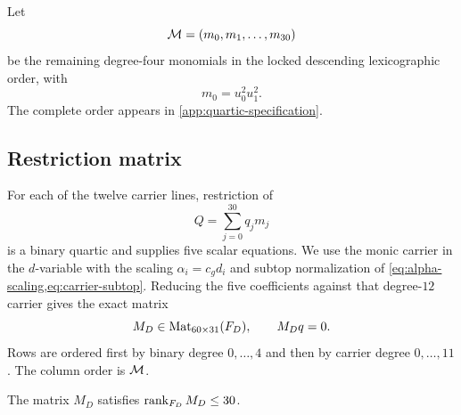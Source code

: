 Let
\[
 \mathcal M=(m_0,m_1,\ldots,m_{30})
\]
be the remaining degree-four monomials in the locked descending
lexicographic order, with
\begin{equation}
 m_0=u_0^2u_1^2.
\label{eq:normalization-monomial}
\end{equation}
The complete order appears in \cref{app:quartic-specification}.

\subsection{Restriction matrix}

For each of the twelve carrier lines, restriction of
\[
 Q=\sum_{j=0}^{30}q_jm_j
\]
is a binary quartic and supplies five scalar equations.  We use the monic
carrier in the \(d\)-variable with the scaling
\(\alpha_i=c_gd_i\) and subtop normalization of
\cref{eq:alpha-scaling,eq:carrier-subtop}.  Reducing the five coefficients
against that degree-\(12\) carrier gives the exact matrix
\begin{equation}
 M_D\in\operatorname{Mat}_{60\times31}(F_D),\qquad M_Dq=0.
\label{eq:restriction-matrix}
\end{equation}
Rows are ordered first by binary degree \(0,\ldots,4\) and then by carrier
degree \(0,\ldots,11\).  The column order is \(\mathcal M\).

\begin{proposition}
\label{prop:rank-upper}
The matrix \(M_D\) satisfies \(\operatorname{rank}_{F_D}M_D\le30\).
\end{proposition}


